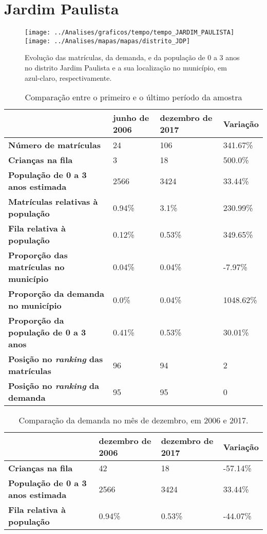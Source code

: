 \section{Jardim Paulista}
\begin{figure}[H]
\centering
\texttt{[image: ../Analises/graficos/tempo/tempo\_JARDIM\_PAULISTA]}
\texttt{[image: ../Analises/mapas/mapas/distrito\_JDP]}
\caption{Evolução das matrículas, da demanda, e da população de 0 a 3 anos no distrito Jardim Paulista e a sua localização no município, em azul-claro, respectivamente.}
\end{figure}
\begin{table}[H]
\begin{tabular}{l|l|l|l}
\textbf{}                                      & \textbf{junho de 2006}       & \textbf{dezembro de 2017}    & \textbf{Variação} \\ \hline
\textbf{Número de matrículas}                  & 24 & 106 & 341.67\% \\ \hline
\textbf{Crianças na fila}                      & 3 & 18 & 500.0\% \\ \hline
\textbf{População de 0 a 3 anos estimada}      & 2566 & 3424 & 33.44\% \\ \hline
\textbf{Matrículas relativas à população}      & 0.94\% & 3.1\% & 230.99\% \\ \hline
\textbf{Fila relativa à população}             & 0.12\% & 0.53\% & 349.65\% \\ \hline
\textbf{Proporção das matrículas no município} & 0.04\% & 0.04\% & -7.97\% \\ \hline
\textbf{Proporção da demanda no município}     & 0.0\% & 0.04\% & 1048.62\% \\ \hline
\textbf{Proporção da população de 0 a 3 anos}  & 0.41\% & 0.53\% & 30.01\% \\ \hline
\textbf{Posição no \textit{ranking} das matrículas}     & 96 & 94 & 2 \\ \hline
\textbf{Posição no \textit{ranking} da demanda}         & 95 & 95 & 0 \\ 
\end{tabular}
\caption{Comparação entre o primeiro e o último período da amostra}
\end{table}
\begin{table}[H]
\begin{tabular}{l|l|l|l}
\textbf{}                                 & \textbf{dezembro de 2006} & \textbf{dezembro de 2017} & \textbf{Variação} \\ \hline
\textbf{Crianças na fila}                      & 42 & 18 & -57.14\% \\ \hline
\textbf{População de 0 a 3 anos estimada}      & 2566 & 3424 & 33.44\% \\ \hline
\textbf{Fila relativa à população}             & 0.94\% & 0.53\% & -44.07\% \\
\end{tabular}
\caption{Comparação da demanda no mês de dezembro, em 2006 e 2017.}
\end{table}
